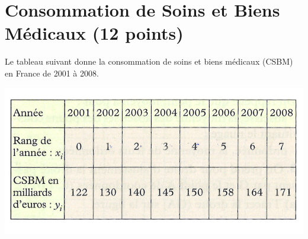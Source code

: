 \section{Consommation de Soins et Biens Médicaux (12 points)}

Le tableau suivant donne la consommation de soins et biens médicaux (CSBM) en France de 2001 à 2008.

\begin{center}
	\includegraphics[scale=1.2]{csbm}
\end{center}

